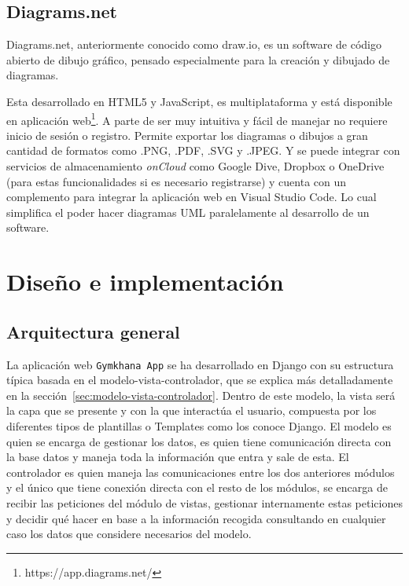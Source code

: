 \documentclass[a4paper, 12pt]{book}
\begin{document}
\section{Diagrams.net}
Diagrams.net, anteriormente conocido como draw.io, es un software de código abierto de dibujo gráfico, pensado especialmente para la creación y dibujado de diagramas.

Esta desarrollado en HTML5 y JavaScript, es multiplataforma y está disponible en aplicación web\footnote{https://app.diagrams.net/}. A parte de ser muy intuitiva y fácil de manejar no requiere inicio de sesión o registro. Permite exportar los diagramas o dibujos a gran cantidad de formatos como .PNG, .PDF, .SVG y .JPEG. Y se puede integrar con servicios de almacenamiento \emph{onCloud} como Google Dive, Dropbox o OneDrive (para estas funcionalidades si es necesario registrarse) y cuenta con un complemento para integrar la aplicación web en Visual Studio Code. Lo cual simplifica el poder hacer diagramas UML paralelamente al desarrollo de un software.



\chapter{Diseño e implementación}
\label{chap:diseño}


\section{Arquitectura general} 
\label{sec:arquitectura}

La aplicación web \texttt{Gymkhana App} se ha desarrollado en Django con su estructura típica basada en el modelo-vista-controlador, que se explica más detalladamente en la sección~\ref{sec:modelo-vista-controlador}. Dentro de este modelo, la vista será la capa que se presente y con la que interactúa el usuario, compuesta por los diferentes tipos de plantillas o Templates como los conoce Django. El modelo es quien se encarga de gestionar los datos, es quien tiene comunicación directa con la base datos y maneja toda la información que entra y sale de esta. El controlador es quien maneja las comunicaciones entre los dos anteriores módulos y el único que tiene conexión directa con el resto de los módulos, se encarga de recibir las peticiones del módulo de vistas, gestionar internamente estas peticiones y decidir qué hacer en base a la información recogida consultando en cualquier caso los datos que considere necesarios del modelo. 
\end{document}
